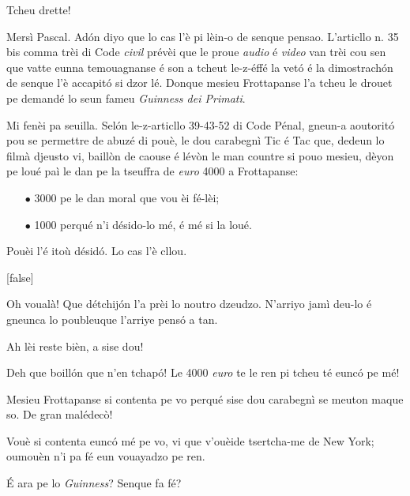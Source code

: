 \begin{drama}
\Pascalspeaks Tcheu drette!


\DzeudzoSenliquerspeaks Mersì Pascal. Adón diyo que lo cas l'è pi lèin-o de senque pensao. L'articllo n. 35 bis comma trèi di Code \textit{civil} prévèi que le proue \textit{audio} é \textit{video} van trèi cou sen que vatte eunna temouagnanse é son a tcheut le-z-éffé la vetó é la dimostrachón de senque l’è accapitó si dzor lé. Donque mesieu Frottapanse l'a tcheu le drouet pe demandé lo seun fameu \textit{Guinness dei Primati}.


\DzeudzoSenliquerspeaks Mi fenèi pa seuilla. Selón le-z-articllo 39-43-52 di Code Pénal, gneun-a aoutoritó pou se permettre de abuzé di pouè, le dou carabegnì Tic é Tac que, dedeun lo filmà djeusto vi, baillòn de caouse é lévòn le man countre si pouo mesieu, dèyon pe loué paì le dan pe la tseuffra de \textit{euro} 4000 a Frottapanse: 
\begin{itemize}
\item[$\bullet$] 3000 pe le dan moral que vou èi fé-lèi;
\item[$\bullet$] 1000 perqué n’i désido-lo mé, é mé si la loué.
\end{itemize}
Pouèi l'é itoù désidó. Lo cas l'è cllou.

[false]


\Ritaspeaks Oh voualà! Que détchijón l’a prèi lo noutro dzeudzo. N'arriyo jamì deu-lo é gneunca lo poubleuque l'arriye pensó a tan.

\Cienspeaks Ah lèi reste bièn, a sise dou!

\Ticspeaks{} Deh que boillón que n'en tchapó! Le 4000 \textit{euro} te le ren pi tcheu té eunc\'o pe mé!

\Ritaspeaks Mesieu Frottapanse si contenta pe vo perqué sise dou carabegnì se meuton maque so. De gran malédec\`o!

\Tissotspeaks Vouè si contenta eunc\'o mé pe vo, vi que v'ouèide tsertcha-me de New York; oumouèn n’i pa fé eun vouayadzo pe ren.

\Cienspeaks É ara pe lo \textit{Guinness}? Senque fa fé?


\end{drama}
